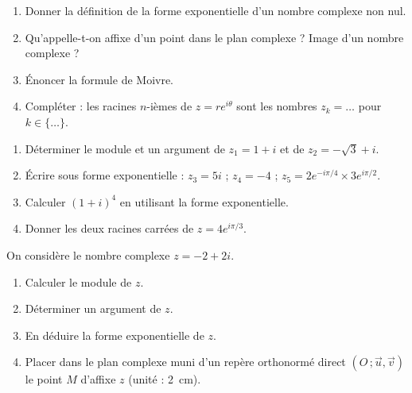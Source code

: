 \documentclass[11pt]{article}
\newcounter{popsec}
\newcounter{popsub}
\newcommand{\courssub}[1]{%
  \stepcounter{popsub}%
  \par\vspace{9pt}\noindent{\popxbold\fontsize{11.5}{13}\selectfont\color{popink}{\color{poporange}\thepopsec.\thepopsub}\hspace{6pt}#1}\par\nopagebreak\vspace{4pt}
}
\begin{document}
\begin{exercice}
\begin{enumerate}
\item Donner la définition de la forme exponentielle d'un nombre complexe non nul.
\item Qu'appelle-t-on affixe d'un point dans le plan complexe ? Image d'un nombre complexe ?
\item Énoncer la formule de Moivre.
\item Compléter : les racines $n$-ièmes de $z = re^{i\theta}$ sont les nombres $z_k = \ldots$ pour $k \in \{\ldots\}$.
\end{enumerate}
\end{exercice}

\begin{exercice}
\begin{enumerate}
\item Déterminer le module et un argument de $z_1 = 1 + i$ et de $z_2 = -\sqrt{3} + i$.
\item Écrire sous forme exponentielle : $z_3 = 5i$ ; $z_4 = -4$ ; $z_5 = 2e^{-i\pi/4} \times 3e^{i\pi/2}$.
\item Calculer $(1 + i)^4$ en utilisant la forme exponentielle.
\item Donner les deux racines carrées de $z = 4e^{i\pi/3}$.
\end{enumerate}
\end{exercice}

\courssub{Je m'entraîne}

\begin{exercice}
On considère le nombre complexe $z = -2 + 2i$.
\begin{enumerate}
\item Calculer le module de $z$.
\item Déterminer un argument de $z$.
\item En déduire la forme exponentielle de $z$.
\item Placer dans le plan complexe muni d'un repère orthonormé direct $(O\,;\vec{u},\vec{v})$ le point $M$ d'affixe $z$ (unité : \SI{2}{cm}).
\end{enumerate}
\end{exercice}
\end{document}
